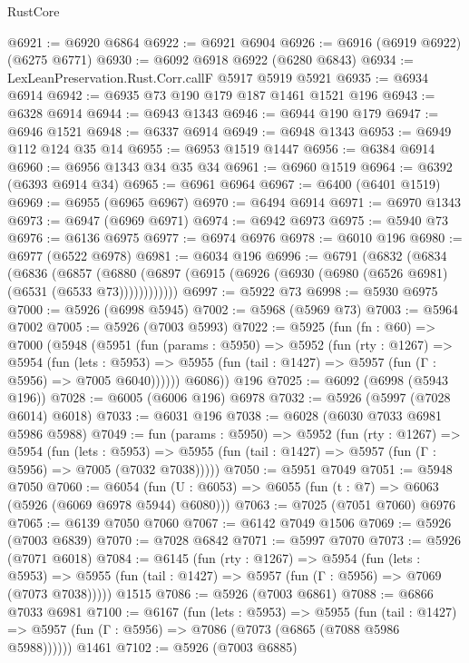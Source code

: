\begin{lexlean}{RustCore}
\begin{coremodule}
@6921 := @6920 @6864
@6922 := @6921 @6904
@6926 := @6916 (@6919 @6922) (@6275 @6771)
@6930 := @6092 @6918 @6922 (@6280 @6843)
@6934 := LexLeanPreservation.Rust.Corr.callF @5917 @5919 @5921
@6935 := @6934 @6914
@6942 := @6935 @73 @190 @179 @187 @1461 @1521 @196
@6943 := @6328 @6914
@6944 := @6943 @1343
@6946 := @6944 @190 @179
@6947 := @6946 @1521
@6948 := @6337 @6914
@6949 := @6948 @1343
@6953 := @6949 @112 @124 @35 @14
@6955 := @6953 @1519 @1447
@6956 := @6384 @6914
@6960 := @6956 @1343 @34 @35 @34
@6961 := @6960 @1519
@6964 := @6392 (@6393 @6914 @34)
@6965 := @6961 @6964
@6967 := @6400 (@6401 @1519)
@6969 := @6955 (@6965 @6967)
@6970 := @6494 @6914
@6971 := @6970 @1343
@6973 := @6947 (@6969 @6971)
@6974 := @6942 @6973
@6975 := @5940 @73
@6976 := @6136 @6975
@6977 := @6974 @6976
@6978 := @6010 @196
@6980 := @6977 (@6522 @6978)
@6981 := @6034 @196
@6996 := @6791
    (@6832
      (@6834
        (@6836
          (@6857
            (@6880 (@6897 (@6915 (@6926 (@6930 (@6980 (@6526 @6981) (@6531 (@6533 @73))))))))))))
@6997 := @5922 @73
@6998 := @5930 @6975
@7000 := @5926 (@6998 @5945)
@7002 := @5968 (@5969 @73)
@7003 := @5964 @7002
@7005 := @5926 (@7003 @5993)
@7022 := @5925
    (fun (fn : @60) =>
    @7000
      (@5948
        (@5951
          (fun (params : @5950) =>
          @5952
            (fun (rty : @1267) =>
            @5954
              (fun (lets : @5953) =>
              @5955 (fun (tail : @1427) => @5957 (fun (Γ : @5956) => @7005 @6040))))))
        @6086))
    @196
@7025 := @6092 (@6998 (@5943 @196))
@7028 := @6005 (@6006 @196) @6978
@7032 := @5926 (@5997 (@7028 @6014) @6018)
@7033 := @6031 @196
@7038 := @6028 (@6030 @7033 @6981 @5986 @5988)
@7049 := fun (params : @5950) =>
  @5952
    (fun (rty : @1267) =>
    @5954
      (fun (lets : @5953) =>
      @5955 (fun (tail : @1427) => @5957 (fun (Γ : @5956) => @7005 (@7032 @7038)))))
@7050 := @5951 @7049
@7051 := @5948 @7050
@7060 := @6054 (fun (U : @6053) => @6055 (fun (t : @7) => @6063 (@5926 (@6069 @6978 @5944) @6080)))
@7063 := @7025 (@7051 @7060) @6976
@7065 := @6139 @7050 @7060
@7067 := @6142 @7049 @1506
@7069 := @5926 (@7003 @6839)
@7070 := @7028 @6842
@7071 := @5997 @7070
@7073 := @5926 (@7071 @6018)
@7084 := @6145
    (fun (rty : @1267) =>
    @5954
      (fun (lets : @5953) =>
      @5955 (fun (tail : @1427) => @5957 (fun (Γ : @5956) => @7069 (@7073 @7038)))))
    @1515
@7086 := @5926 (@7003 @6861)
@7088 := @6866 @7033 @6981
@7100 := @6167
    (fun (lets : @5953) =>
    @5955
      (fun (tail : @1427) => @5957 (fun (Γ : @5956) => @7086 (@7073 (@6865 (@7088 @5986 @5988))))))
    @1461
@7102 := @5926 (@7003 @6885)

\end{coremodule}
\end{lexlean}
